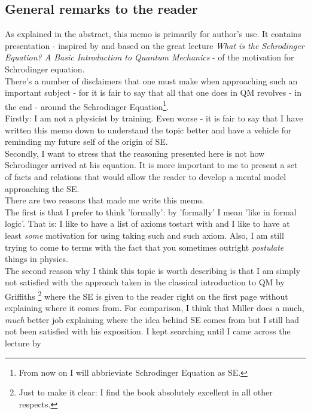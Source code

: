 \documentclass[12pt]{article}
\begin{document}
\subsection{General remarks to the reader}
As explained in the abstract, this memo is primarily for author's use. It contains presentation - inspired by and based on the great lecture \textit{What is the Schrodinger Equation? A Basic Introduction to Quantum Mechanics} 
\cite{what_is_the_se} - of the motivation for Schrodinger equation. 
\\ \indent There's a number of disclaimers that one must make when approaching such an important subject - for it is fair to say that all that one does in QM revolves - in the end - around the 
Schrodinger Equation\footnote{From now on I will abbrieviate Schrodinger Equation as SE.}.
\\ \indent Firstly: I am not a physicist by training. Even worse - it is fair to say that I have written this memo down to understand the topic better and have a vehicle for reminding my future self of the origin of SE. 
\\ \indent Secondly, I want to stress that the reasoning presented here is not how Schrodinger arrived at his equation. It is more important to me to present a set of facts and relations that would allow the reader to develop
a mental model approaching the SE.
\\ \indent There are two reasons that made me write this memo.
\\ \indent The first is that I prefer to think 'formally': by 'formally' I mean 'like in formal logic'. That is: I like to have a list of axioms tostart with and I like to have at least \textit{some} motivation for using taking such and such axiom. Also, I am still trying to come to terms with the fact 
that you sometimes outright \textit{postulate} things in physics.  
\\\indent The second reason why I think this topic is worth describing is that I am simply not satisfied with the approach taken in the 
classical introduction to QM by Griffiths \cite{qm_handbook_griffiths}\footnote{Just to make it clear: I find the book absolutely excellent in all other respects. }
where the SE is given to the reader right on the first page without explaining where it comes from. For comparison, I think that Miller \cite{qm_handbook_miller} does a much, \textit{much} better job
explaining where the idea behind SE comes from but I still had not been satisfied with his exposition. I kept searching until I came across the lecture by 
\end{document}
